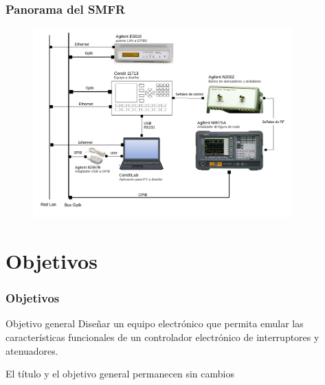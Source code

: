 \documentclass[xcolor=pdftext, table]{beamer}
\begin{document}
	\begin{frame}
		\frametitle{Panorama del SMFR}			
	
		\begin{figure}
			\begin{center}
				\includegraphics[width=10cm]{Imagenes/DiagramaBloquesSistema.pdf}
			\end{center}
		\end{figure}	
	
	\end{frame}
	
	\section{Objetivos} 
	
	\begin{frame}
		\frametitle{Objetivos}		
		
		\begin{block}{Objetivo general}
			\centering
			Diseñar un equipo electrónico que permita emular las características funcionales de un controlador electrónico de interruptores y atenuadores.
		\end{block}
		
		El título y el objetivo general permanecen sin cambios	
		
	\end{frame}
	
\end{document}

